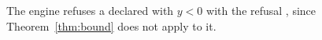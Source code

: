 
\begin{requirement}\label{req:refuse}
The engine refuses a declared  with $y < 0$ with the refusal
, since Theorem~\ref{thm:bound} does not
apply to it.
\end{requirement}
